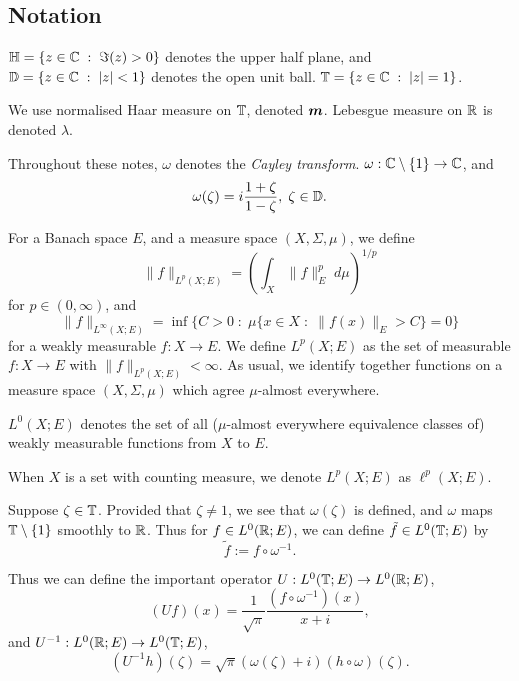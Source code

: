 \subsection{Notation}
$\mathbb{H} = \{z \in \mathbb{C}\;:\;\Im(z) > 0\}$ denotes the upper half plane,
and $\mathbb{D} = \{z\in \mathbb{C}\;:\; |z| < 1\}$ denotes the open unit ball.
$\mathbb{T} = \{z \in \mathbb{C}\;:\; |z| = 1\}$.

We use normalised Haar measure on $\mathbb{T}$, denoted $\boldsymbol{m}$. Lebesgue
measure on $\mathbb{R}$ is denoted $\lambda$.

Throughout these notes, $\omega$ denotes the \emph{Cayley transform}.
$\omega:\mathbb{C}\setminus\{1\}\rightarrow \mathbb{C}$, and 
\begin{equation}
    \omega(\zeta) = i\frac{1+\zeta}{1-\zeta},\;\zeta \in \mathbb{D}.
\end{equation}

For a Banach space $E$, and a measure space $(X,\Sigma,\mu)$, we define
\begin{equation}
    \|f\|_{L^p(X;E)} = \left(\int_X \|f\|_E^p \;d\mu\right)^{1/p}
\end{equation}
for $p \in (0,\infty)$, and
\begin{equation}
    \|f\|_{L^\infty(X;E)} = \inf\{C > 0 \;:\; \mu\{x \in X \;:\; \|f(x)\|_E > C\} = 0\}
\end{equation}
for a weakly measurable $f:X\rightarrow E$. We define $L^p(X;E)$ as the set
of measurable $f:X\rightarrow E$ with $\|f\|_{L^p(X;E)} < \infty$. As usual, 
we identify together functions on a measure space $(X,\Sigma,\mu)$ 
which agree $\mu$-almost everywhere.

$L^0(X;E)$ denotes the set of all ($\mu$-almost everywhere equivalence classes of)
weakly measurable functions from $X$ to $E$.

When $X$ is a set with counting measure, we denote $L^p(X;E)$ as $\ell^p(X;E)$.

Suppose $\zeta \in \mathbb{T}$. Provided that $\zeta \neq 1$, we see that $\omega(\zeta)$
is defined, and $\omega$ maps $\mathbb{T}\setminus\{1\}$ smoothly to $\mathbb{R}$. Thus for
$f \in L^0(\mathbb{R};E)$, we can define $\tilde{f} \in L^0(\mathbb{T};E)$
by 
\begin{equation}
    \tilde{f} := f\circ \omega^{-1}.
\end{equation}

Thus we can define the important operator $U:L^0(\mathbb{T};E)\rightarrow L^0(\mathbb{R};E)$,
\begin{equation}
\label{cayleyTransform}
    (U f)(x) = \frac{1}{\sqrt{\pi}}\frac{(f\circ \omega^{-1})(x)}{x+i},
\end{equation}
and $U^{-1}:L^0(\mathbb{R};E)\to L^0(\mathbb{T};E)$,
\begin{equation}
        (U^{-1}h)(\zeta) = \sqrt{\pi}(\omega(\zeta)+i)(h\circ\omega)(\zeta).
\end{equation}

